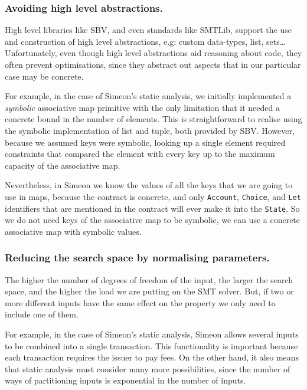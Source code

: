 \documentclass[english,runningheads]{llncs}
\begin{document}
\subsubsection{Avoiding high level abstractions.}

High level libraries like SBV, and even standards like SMTLib, support
the use and construction of high level abstractions,
e.g: custom data-types, list, sets\ldots{} Unfortunately, even though
high level abstractions aid reasoning about code, they often
prevent optimisations, since they abstract out aspects that
in our particular case may be concrete.

For example, in the case of Simeon's static analysis, we initially
implemented a \emph{symbolic} associative map primitive with the only limitation
that it needed a concrete bound in the number of elements. This is
straightforward to realise using the symbolic implementation of list
and tuple, both provided by SBV. However, because we assumed keys
were symbolic, looking up a single element required constraints that
compared the element with every key up to the maximum capacity of
the associative map.

Nevertheless, in Simeon we know the values of all the keys that we are
going to use in maps, because the contract is concrete, and only \texttt{Account},
\texttt{Choice}, and \texttt{Let} identifiers that are mentioned in
the contract will ever make it into the \texttt{State}. So we do not
need keys of the associative map to be symbolic, we can use a concrete
associative map with symbolic values.

\subsubsection{Reducing the search space by normalising parameters.
\label{subsec:Reducing-search-space-by-normalising-parameters}}

The higher the number of degrees of freedom of the input, the larger
the search space, and the higher the load we are putting on the SMT
solver. But, if two or more different inputs have the same effect on the
property we only need to include one of them.

For example, in the case of Simeon's static analysis,
Simeon allows several inputs to be combined into a single transaction.
This functionality is important because each transaction requires
the issuer to pay fees. On the other hand, it also means
that static analysis must consider many more possibilities, since
the number of ways of partitioning inputs is exponential
in the number of inputs.
\end{document}
